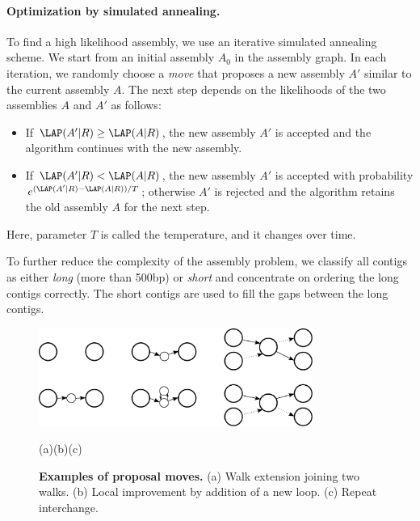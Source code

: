 \paragraph{Optimization by simulated annealing.}

To find a high likelihood assembly, we use an iterative
simulated annealing scheme. We start from an initial assembly $A_0$
in the assembly graph. In each iteration, we randomly choose a
\emph{move} that proposes a new assembly $A'$ similar to the current
assembly $A$. The next step depends on the likelihoods of the
two assemblies $A$ and $A'$ as follows:
\begin{itemize}
\item If $\LAP(A'|R)\ge \LAP(A|R)$, the new assembly $A'$ is accepted and
  the algorithm continues with the new assembly.
\item If $\LAP(A'|R)< \LAP(A|R)$, the new assembly $A'$ is accepted
  with probability\linebreak $e^{(\LAP(A'|R)-\LAP(A|R))/T}$; otherwise $A'$ 
  is rejected and the algorithm retains the old assembly $A$ for
  the next step.
\end{itemize}
Here, parameter $T$ is called the temperature, and it changes over time.

To further reduce the complexity of the assembly problem, we 
classify all contigs as either \emph{long} (more than 500bp) 
or \emph{short}
and concentrate on ordering the long contigs correctly. 
The short contigs are used to fill the gaps between the
long contigs. 

\begin{figure}[t]
\centerline{\includegraphics[width=0.8\textwidth]{../figures/p3.pdf}}
\hphantom{a}\hfill(a)\hfill\hfill(b)\hfill\hfill(c)\hfill~
\caption{{\bf Examples of proposal moves.} (a) Walk extension joining
two walks. (b) Local improvement by addition of a new loop.
(c) Repeat interchange.
\label{fig:moves}
}
\end{figure}

